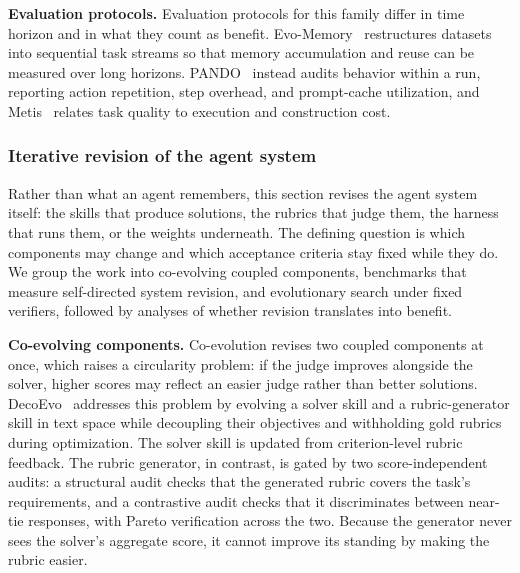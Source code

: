 \noindent\textbf{Evaluation protocols.} Evaluation protocols for this family differ in time horizon and in what they count as benefit. Evo-Memory~\cite{wei2025evo} restructures datasets into sequential task streams so that memory accumulation and reuse can be measured over long horizons. PANDO~\cite{li2026pando} instead audits behavior within a run, reporting action repetition, step overhead, and prompt-cache utilization, and Metis~\cite{dai2026metis} relates task quality to execution and construction cost.

\subsubsection{Iterative revision of the agent system}

Rather than what an agent remembers, this section revises the agent system itself: the skills that produce solutions, the rubrics that judge them, the harness that runs them, or the weights underneath. The defining question is which components may change and which acceptance criteria stay fixed while they do. We group the work into co-evolving coupled components, benchmarks that measure self-directed system revision, and evolutionary search under fixed verifiers, followed by analyses of whether revision translates into benefit.

\noindent\textbf{Co-evolving components.} Co-evolution revises two coupled components at once, which raises a circularity problem: if the judge improves alongside the solver, higher scores may reflect an easier judge rather than better solutions. DecoEvo~\cite{chen2026decoevo} addresses this problem by evolving a solver skill and a rubric-generator skill in text space while decoupling their objectives and withholding gold rubrics during optimization. The solver skill is updated from criterion-level rubric feedback. The rubric generator, in contrast, is gated by two score-independent audits: a structural audit checks that the generated rubric covers the task's requirements, and a contrastive audit checks that it discriminates between near-tie responses, with Pareto verification across the two. Because the generator never sees the solver's aggregate score, it cannot improve its standing by making the rubric easier.

